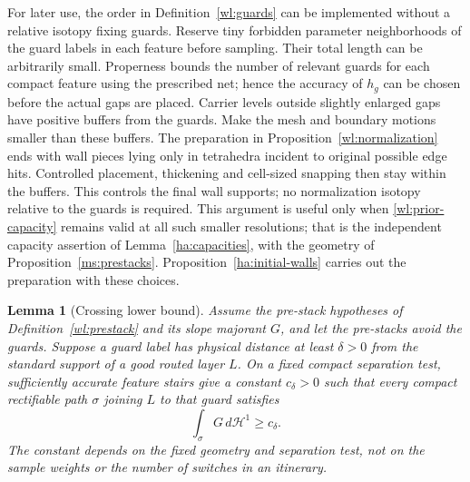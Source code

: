 \documentclass[11pt]{article}
\numberwithin{equation}{section}
\newtheorem{lemma}[theorem]{Lemma}
\theoremstyle{definition}
\theoremstyle{remark}
\begin{document}
For later use, the order in Definition~\ref{wl:guards} can be
implemented without a relative isotopy fixing guards.  Reserve tiny
forbidden parameter neighborhoods of the guard labels in each
feature before sampling.  Their total length can be arbitrarily
small.  Properness bounds the number of relevant guards for each
compact feature using the prescribed net; hence the accuracy of
$h_g$ can be chosen before the actual gaps are placed.  Carrier
levels outside slightly enlarged gaps have positive buffers from the
guards.  Make the mesh and boundary motions smaller than these
buffers.  The preparation in Proposition~\ref{wl:normalization} ends with
wall pieces lying only in tetrahedra incident to original possible
edge hits.
Controlled placement, thickening and cell-sized snapping then stay
within the buffers.  This controls the final wall supports; no
normalization isotopy relative to the guards is required.
This argument is useful only when
\eqref{wl:prior-capacity} remains valid at all such smaller
resolutions; that is the independent capacity assertion of
Lemma~\ref{ha:capacities}, with the geometry of
Proposition~\ref{ms:prestacks}.  Proposition~\ref{ha:initial-walls}
carries out the preparation with these choices.

\begin{lemma}[Crossing lower bound]\label{wl:crossing-bound}
Assume the pre-stack hypotheses of Definition~\ref{wl:prestack} and
its slope majorant $G$, and let the pre-stacks avoid the guards.
Suppose a guard label has physical distance at least $\delta>0$ from
the standard support of a good routed layer $L$.  On a fixed compact
separation test, sufficiently accurate feature stairs give a
constant $c_\delta>0$ such that every compact rectifiable path $\sigma$
joining $L$ to that guard satisfies
\begin{equation}\label{wl:path-cost}
 \int_\sigma G\,d\mathcal H^1\geq c_\delta.
\end{equation}
The constant depends on the fixed geometry and separation test, not
on the sample weights or the number of switches in an itinerary.
\end{lemma}
\end{document}
